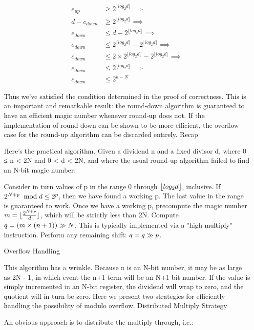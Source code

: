 $$\begin{align} e_{up} & \ge 2^{\lfloor log_2 d \rfloor} \implies \\ d - e_{down} & \ge 2^{\lfloor log_2 d \rfloor} \implies \\ e_{down} & \le d - 2^{\lfloor log_2 d \rfloor} \implies \\ e_{down} & \le 2^{\lceil log_2 d \rceil} - 2^{\lfloor log_2 d \rfloor} \implies \\ e_{down} & \le 2 \times 2^{\lfloor log_2 d \rfloor} - 2^{\lfloor log_2 d \rfloor} \implies \\ e_{down} & \le 2^{\lfloor log_2 d \rfloor} \implies \\ e_{down} & \le 2^{k-N} \end{align} $$

Thus we've satisfied the condition determined in the proof of correctness. This is an important and remarkable result: the round-down algorithm is guaranteed to have an efficient magic number whenever round-up does not. If the implementation of round-down can be shown to be more efficient, the overflow case for the round-up algorithm can be discarded entirely.
Recap

Here's the practical algorithm. Given a dividend n and a fixed divisor d, where 0 ≤ n < 2N and 0 < d < 2N, and where the usual round-up algorithm failed to find an N-bit magic number:

    Consider in turn values of p in the range 0 through $ \small \lfloor log_2 d \rfloor $, inclusive.
    If $ \small 2^{N + p}\ \bmod{d} \le 2^p $, then we have found a working p. The last value in the range is guaranteed to work.
    Once we have a working p, precompute the magic number $ \small m = \lfloor \frac {2^{N + p}} d \rfloor $, which will be strictly less than 2N.
    Compute $ \small q = (m \times (n+1)) \gg N $. This is typically implemented via a "high multiply" instruction.
    Perform any remaining shift: $ \small q = q \gg p $.

Overflow Handling

This algorithm has a wrinkle. Because n is an N-bit number, it may be as large as 2N - 1, in which event the n+1 term will be an N+1 bit number. If the value is simply incremented in an N-bit register, the dividend will wrap to zero, and the quotient will in turn be zero. Here we present two strategies for efficiently handling the possibility of modulo overflow.
Distributed Multiply Strategy

An obvious approach is to distribute the multiply through, i.e.:


